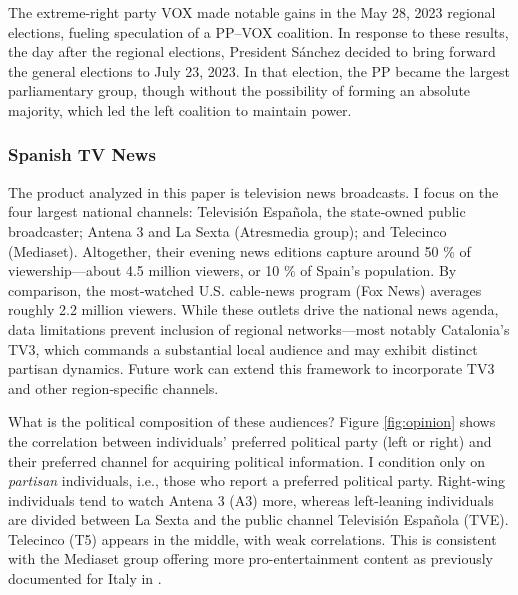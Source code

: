 \documentclass[12pt]{article}
\begin{document}
	
	 The extreme-right party VOX made notable gains in the May 28, 2023 regional elections, fueling speculation of a PP–VOX coalition. In response to these results, the day after the regional elections, President Sánchez decided to bring forward the general elections to July 23, 2023. In that election, the PP became the largest parliamentary group, though without the possibility of forming an absolute majority, which led  the left coalition to maintain power. 
	
	
	
	
	
	
	
	
	
	
	\subsubsection*{Spanish TV News}
	
	
	The product analyzed in this paper is television news broadcasts. I focus on the four largest national channels: Televisión Española, the state‐owned public broadcaster; Antena 3 and La Sexta (Atresmedia group); and Telecinco (Mediaset). Altogether, their evening news editions capture around 50 \% of viewership—about 4.5 million viewers, or 10 \% of Spain’s population. By comparison, the most‐watched U.S. cable‐news program (Fox News) averages roughly 2.2 million  viewers. While these outlets drive the national news agenda, data limitations prevent inclusion of regional networks—most notably Catalonia’s TV3, which commands a substantial local audience and may exhibit distinct partisan dynamics. Future work can extend this framework to incorporate TV3 and other region‐specific channels.  
	


What is the political composition of these audiences? Figure \ref{fig:opinion} shows the correlation between individuals' preferred political party (left or right) and their preferred channel for acquiring political information. I condition only on \textit{partisan} individuals, i.e., those who report a preferred political party. Right-wing individuals  tend to watch Antena 3 (A3) more, whereas left-leaning individuals are divided between La Sexta and the public channel Televisión Española (TVE). Telecinco (T5)  appears in the middle, with weak correlations. This is consistent with the Mediaset group offering more pro-entertainment content as previously documented for Italy in \citet{durante_aer}.
\end{document}
